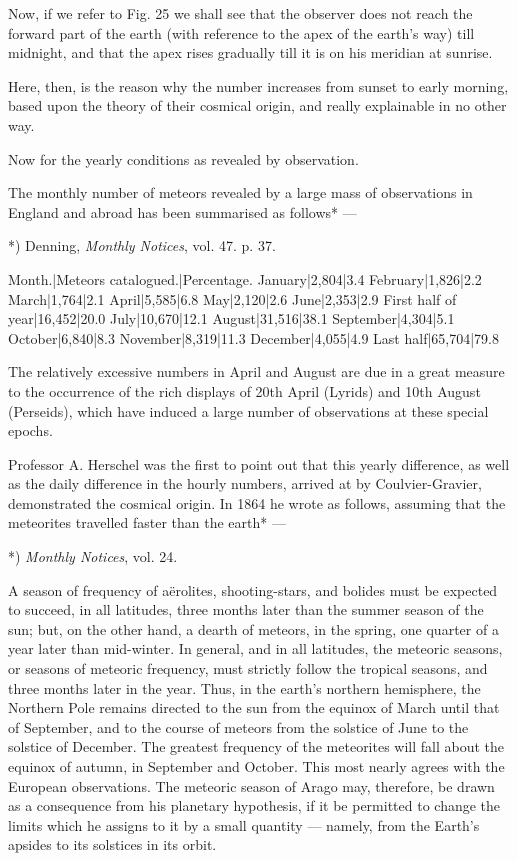 \documentclass[a4paper, 12pt, oneside, polutonikogreek, english]{article}
\begin{document}
Now, if we refer to Fig. 25 we shall see that the observer does not reach the forward part of the earth (with reference to the apex of the earth's way) till midnight, and that the apex rises gradually till it is on his meridian at sunrise.

Here, then, is the reason why the number increases from sunset to early morning, based upon the theory of their cosmical origin, and really explainable in no other way.

Now for the yearly conditions as revealed by observation.

The monthly number of meteors revealed by a large mass of observations in England and abroad has been summarised as follows* ---

*) Denning, \emph{Monthly Notices}, vol. 47. p. 37.

Month.|Meteors catalogued.|Percentage. 
January|2,804|3.4 
February|1,826|2.2 
March|1,764|2.1 
April|5,585|6.8 
May|2,120|2.6 
June|2,353|2.9 
First half of year|16,452|20.0 
July|10,670|12.1 
August|31,516|38.1 
September|4,304|5.1 
October|6,840|8.3 
November|8,319|11.3 
December|4,055|4.9 
Last half|65,704|79.8

The relatively excessive numbers in April and August are due in a great measure to the occurrence of the rich displays of 20th April (Lyrids) and 10th August (Perseids), which have induced a large number of observations at these special epochs.

Professor A. Herschel was the first to point out that this yearly difference, as well as the daily difference in the hourly numbers, arrived at by Coulvier-Gravier, demonstrated the cosmical origin. In 1864 he wrote as follows, assuming that the meteorites travelled faster than the earth* ---

*) \emph{Monthly Notices}, vol. 24.

A season of frequency of aërolites, shooting-stars, and bolides must be expected to succeed, in all latitudes, three months later than the summer season of the sun; but, on the other hand, a dearth of meteors, in the spring, one quarter of a year later than mid-winter. In general, and in all latitudes, the meteoric seasons, or seasons of meteoric frequency, must strictly follow the tropical seasons, and three months later in the year. Thus, in the earth's northern hemisphere, the Northern Pole remains directed to the sun from the equinox of March until that of September, and to the course of meteors from the solstice of June to the solstice of December. The greatest frequency of the meteorites will fall about the equinox of autumn, in September and October. This most nearly agrees with the European observations. The meteoric season of Arago may, therefore, be drawn as a consequence from his planetary hypothesis, if it be permitted to change the limits which he assigns to it by a small quantity --- namely, from the Earth's apsides to its solstices in its orbit.
\end{document}
